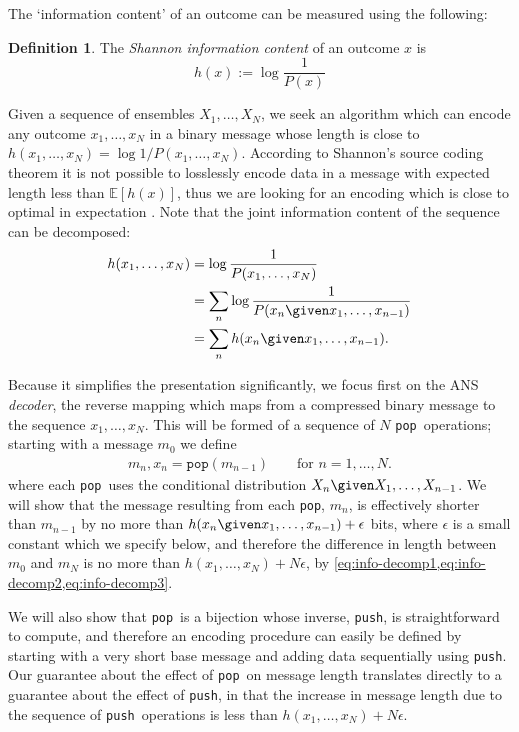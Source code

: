 \documentclass{article}
\theoremstyle{definition}
\newtheorem{definition}{Definition}
\newcommand{\push}{\texttt{push}}
\newcommand{\pop}{\texttt{pop}}
\begin{document}
  The `information content' of an outcome can be measured using the following:
  \begin{definition}
    The \emph{Shannon information content} of an outcome \(x\) is
    \begin{equation}
      h(x) := \log \frac{1}{P(x)}
    \end{equation}
  \end{definition}
  Given a sequence of ensembles \(X_1, \ldots, X_N\), we seek an algorithm
  which can encode any outcome \(x_1, \ldots, x_N\) in a binary message whose
  length is close to \(h(x_1, \ldots, x_N) = \log 1/P(x_1, \ldots, x_N)\).
  According to Shannon's source coding theorem it is not possible to losslessly
  encode data in a message with expected length less than \(\mathbb{E}[h(x)]\),
  thus we are looking for an encoding which is close to optimal in expectation
  \citep{shannon1948}. Note that the joint information content of the sequence
  can be decomposed:
  \begin{align}
    \label{eq:info-decomp1}
    h(x_1, \ldots, x_N)
      &= \log\frac{1}{P(x_1, \ldots, x_N)}\\
      \label{eq:info-decomp2}
      &= \sum_n \log\frac{1}{P(x_n \given x_1, \ldots, x_{n-1})}\\
      \label{eq:info-decomp3}
      &= \sum_n h(x_n \given x_1, \ldots, x_{n-1}).
  \end{align}

  Because it simplifies the presentation significantly, we focus first on the
  ANS \emph{decoder}, the reverse mapping which maps from a compressed binary
  message to the sequence \(x_1, \ldots, x_N\). This will be formed of a
  sequence of \(N\) \pop\ operations; starting with a message \(m_0\) we define
  \begin{align}
    m_n, x_n = \pop(m_{n-1})\qquad\text{for }n=1, \ldots, N.
  \end{align}
  where each \pop\ uses the conditional distribution \(X_n\given X_1, \ldots,
  X_{n-1}\). We will show that the message resulting from each \pop, \(m_n\),
  is effectively shorter than \(m_{n-1}\) by no more than \(h(x_n \given x_1,
  \ldots, x_{n-1}) + \epsilon\) bits, where \(\epsilon\) is a small constant
  which we specify below, and therefore the difference in length between
  \(m_0\) and \(m_N\) is no more than \(h(x_1, \ldots, x_N) + N\epsilon\), by
  \cref{eq:info-decomp1,eq:info-decomp2,eq:info-decomp3}.

  We will also show that \pop\ is a bijection whose inverse, \push, is
  straightforward to compute, and therefore an encoding procedure can easily be
  defined by starting with a very short base message and adding data
  sequentially using \push. Our guarantee about the effect of \pop\ on message
  length translates directly to a guarantee about the effect of \push, in that
  the increase in message length due to the sequence of \push\ operations is
  less than \(h(x_1, \ldots, x_N) + N\epsilon\).
\end{document}
